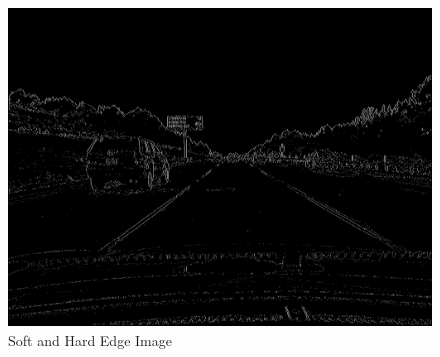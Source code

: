 \documentclass[12pt,a4paper]{report}
\begin{document}
\begin{figure}[!htb]
  \centering
  \includegraphics[height=0.4\paperheight]{output/img2_q2_DTS.png}
  \caption{Soft and Hard Edge Image}
\end{figure}
\clearpage
\end{document}
